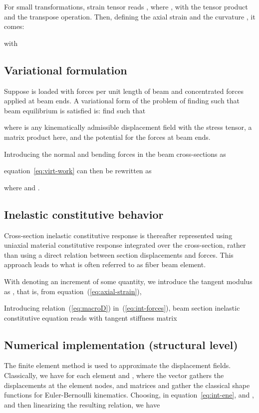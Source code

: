 \documentclass[12p]{amsart}
\begin{document}
For small transformations, strain tensor reads , where , with  the tensor product and  the transpose operation. Then, defining the axial strain  and the curvature , it comes:

with


\subsection{Variational formulation}

Suppose  is loaded with forces per unit length of beam  and concentrated forces applied at beam ends. A variational form of the problem of finding  such that beam equilibrium is satisfied is: find  such that

where  is any kinematically admissible displacement field  with  the stress tensor,  a matrix product here, and  the potential for the forces at beam ends.

Introducing the normal and bending forces in the beam cross-sections as

equation~\eqref{eq:virt-work} can then be rewritten as

where  and .

\subsection{Inelastic constitutive behavior}

Cross-section inelastic constitutive response  is thereafter represented using uniaxial material constitutive response  integrated over the cross-section, rather than using a direct relation between section displacements and forces. This approach leads to what is often referred to as fiber beam element.

With  denoting an increment of some quantity, we introduce the tangent modulus  as , that is, from equation~(\ref{eq:axial-strain}),

Introducing relation~(\ref{eq:macroD}) in~(\ref{eq:int-forces}), beam section inelastic constitutive equation reads  with tangent stiffness matrix


\subsection{Numerical implementation (structural level)}

The finite element method is used to approximate the displacement fields. Classically, we have for each element  and , where the vector  gathers the displacements  at the element nodes, and matrices  and  gather the classical shape functions for Euler-Bernoulli kinematics. Choosing, in equation~\eqref{eq:int-ene},  and , and then linearizing the resulting relation, we have
\end{document}
